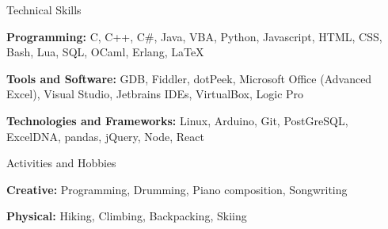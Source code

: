 \documentclass{resume} %
\begin{document}
\begin{rSection}{Technical Skills}

    {\bf Programming:}  C, C++, C\#, Java, VBA, Python, Javascript, HTML, CSS, Bash, Lua, SQL, OCaml, Erlang, LaTeX
    \vspace{-1mm}
    \item {\bf Tools and Software:} GDB, Fiddler, dotPeek, Microsoft Office (Advanced Excel), Visual Studio, Jetbrains IDEs, VirtualBox, Logic Pro
    \vspace{-1mm}
    \item {\bf Technologies and Frameworks:} Linux, Arduino, Git, PostGreSQL, ExcelDNA, pandas, jQuery, Node, React

\vspace{-1mm}
\end{rSection}
\vspace{-1mm}
\begin{rSection}{Activities and Hobbies}

{\bf Creative: }Programming, Drumming, Piano composition, Songwriting
\vspace{-1mm}
\item {\bf Physical: }Hiking, Climbing, Backpacking, Skiing
  


\vspace{-1mm}
\end{rSection}
\vspace{-1mm}
\end{document}
